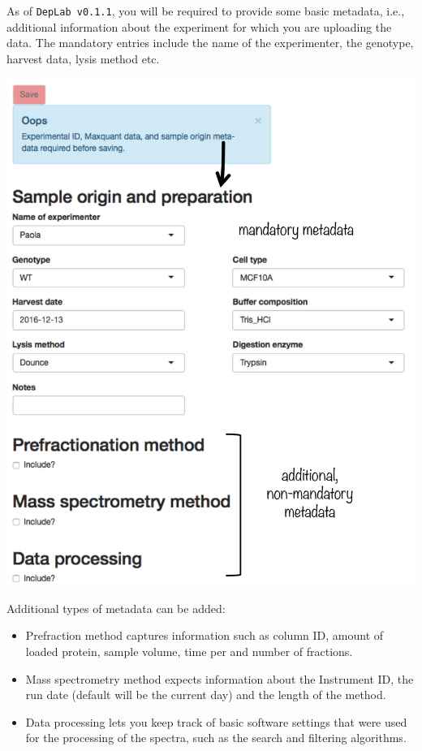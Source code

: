 \documentclass[letterpaper, twocolumn, 9pt]{article}
\begin{document}
As of \texttt{DepLab v0.1.1}, you will be required to provide some basic metadata, i.e., additional information about the experiment for which you are uploading the data.
The mandatory entries include the name of the experimenter, the genotype, harvest data, lysis method etc.

\includegraphics[width=\columnwidth]{figures/ss_dataUpload03.png}


Additional types of metadata can be added:
\begin{itemize}
\item \textsf{Prefraction method} captures information such as column ID, amount of loaded protein, sample volume, time per and number of fractions. 
\item \textsf{Mass spectrometry method} expects information about the Instrument ID, the run date (default will be the current day) and the length of the method.
\item \textsf{Data processing} lets you keep track of basic software settings that were used for the processing of the spectra, such as the search and filtering algorithms.
\end{itemize}
\end{document}
